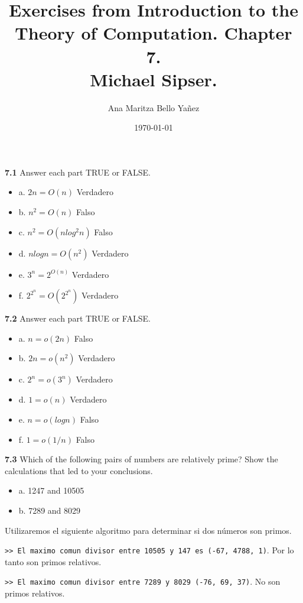 \documentclass{article}
\title{Exercises from Introduction to the Theory of Computation. Chapter 7. 
\\ Michael Sipser.}
\author{Ana Maritza Bello Yañez}
\date{\today}
\begin{document}
\maketitle

\textbf{7.1} Answer each part TRUE or FALSE.
\begin{itemize}
    \item a. $2n = O(n)$    Verdadero
    \item b. $n^2 = O(n)$   Falso
    \item c. $n^2 = O(n log^2 n)$   Falso
    \item d. $n log n = O(n^2)$   Verdadero
    \item e. $3^n = 2^{O(n)}$  Verdadero
    \item f. $2^{2^n} = O(2^{2^n})$ Verdadero
\end{itemize}

\textbf{7.2} Answer each part TRUE or FALSE.
    \begin{itemize}
        \item a. $n = o(2n)$    Falso
        \item b. $2n = o(n^2)$  Verdadero
        \item c. $2^n = o(3^n)$ Verdadero
        \item d. $1 = o(n)$ Verdadero
        \item e. $n = o(log n)$ Falso
        \item f. $1 = o(1/n)$   Falso
    \end{itemize}

\pagebreak

\textbf{7.3} Which of the following pairs of numbers are relatively prime? Show
the calculations that led to your conclusions.

\begin{itemize}
    \item a. 1247 and 10505
    \item b. 7289 and 8029
\end{itemize}

Utilizaremos el siguiente algoritmo para determinar si dos números son primos.



\texttt{>> El maximo comun divisor entre 10505 y 147 es (-67, 4788, 1)}. Por lo
tanto son primos relativos.

\texttt{>> El maximo comun divisor entre 7289 y 8029 (-76, 69, 37)}. No son primos
relativos. \\
\end{document}
